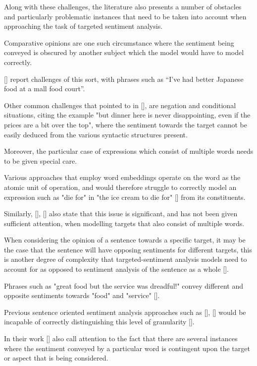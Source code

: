 \documentclass[12pt, a4paper]{report}
\theoremstyle{definition}
\theoremstyle{definition}%
\theoremstyle{definition}%
\theoremstyle{definition}%
\theoremstyle{definition}%
\theoremstyle{definition}%
\renewcommand{\cite}[1]{[\citealp{#1}]}
\begin{document}
Along with these challenges, the literature also presents a number of obstacles and particularly problematic instances that need to be taken into account when approaching the task of targeted sentiment analysis.

Comparative opinions are one such circumstance where the sentiment being conveyed is obscured by another subject which the model would have to model correctly. 

\cite{tang2016} report challenges of this sort, with phrases such as “I've had better Japanese food at a mall food court”. 

Other common challenges that pointed to in \cite{tang2016}, are negation and conditional situations, citing the example "but dinner here is never disappointing, even if the prices are a bit over the top", where the sentiment towards the target cannot be easily deduced from the various syntactic structures present.

Moreover, the particular case of expressions which consist of multiple words needs to be given special care. 

Various approaches that employ word embeddings operate on the word as the atomic unit of operation, and would therefore struggle to correctly model an expression such as "die for" in "the ice cream to die for" \cite{tang2016} from its constituents.

Similarly, \cite{zheng2018}, \cite{tang2016} also state that this issue is significant, and has not been given sufficient attention, when modelling targets that also consist of multiple words.

When considering the opinion of a sentence towards a specific target, it may be the case that the sentence will have opposing sentiments for different targets, this is another degree of complexity that targeted-sentiment analysis models need to account for as opposed to sentiment analysis of the sentence as a whole \cite{tang}.

Phrases such as "great food but the service was dreadful!" convey different and opposite sentiments towards "food" and "service" \cite{tang2016}. 

Previous sentence oriented sentiment analysis approaches such as \cite{socher2011}, \cite{appel2016} would be incapable of correctly distinguishing this level of granularity \cite{chen2017}.

In their work \cite{dehongma2017} also call attention to the fact that there are several instances where the sentiment conveyed by a particular word is contingent upon the target or aspect that is being considered. 
\end{document}
